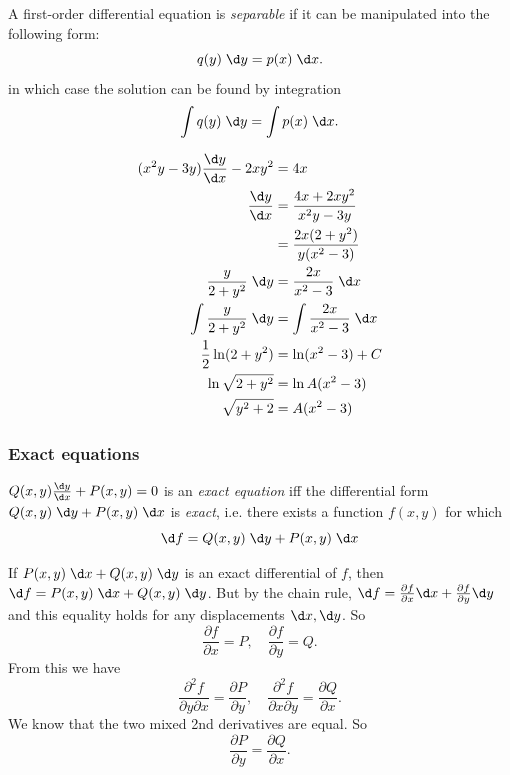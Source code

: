 \documentclass[a4paper]{article}
\begin{document}
\begin{defi}
  A first-order differential equation is \emph{separable} if it can be manipulated into the following form:
  \[
  q(y) \;\d y = p(x) \;\d x.
  \]
  in which case the solution can be found by integration
  \[
  \int q(y)\;\d y = \int p(x)\; \d x.
  \]
\end{defi}

\begin{eg}
  \begin{align*}
    (x^2y - 3y)\frac{\d y}{\d x} - 2xy^2 &= 4x\\
    \frac{\d y}{\d x} &= \frac{4x + 2xy^2}{x^2y - 3y}\\
    &= \frac{2x(2 +  y^2)}{y(x^2 - 3)}\\
    \frac{y}{2 + y^2}\; \d y &= \frac{2x}{x^2 - 3}\;\d x\\
    \int \frac{y}{2 + y^2}\; \d y &= \int\frac{2x}{x^2 - 3}\;\d x\\
    \frac{1}{2}\ln(2 + y^2) &= \ln (x^2 - 3) + C\\
    \ln \sqrt{2 + y^2} &= \ln A(x^2 - 3)\\
    \sqrt{y^2 + 2} &= A(x^2 - 3)
  \end{align*}
\end{eg}
\subsubsection{Exact equations}
\begin{defi}
  $Q(x, y)\frac{\d y}{\d x} + P(x, y) = 0$ is an \emph{exact equation} iff the differential form $Q(x, y)\;\d y + P(x, y)\;\d x$ is \emph{exact}, i.e. there exists a function $f(x, y)$ for which 
  \[
  \d f = Q(x, y)\;\d y + P(x, y)\;\d x
  \]
\end{defi}

If $P(x, y)\;\d x + Q(x, y)\;\d y$ is an exact differential of $f$, then $\d f = P(x, y) \;\d x + Q(x, y)\;\d y$. But by the chain rule, $\d f  = \frac{\partial f}{\partial x}\d x + \frac{\partial f}{\partial y}\d y$ and this equality holds for any displacements $\d x, \d y$. So
\[
\frac{\partial f}{\partial x} = P,\quad\frac{\partial f}{\partial y} = Q.
\]
From this we have
\[
\frac{\partial^2 f}{\partial y\partial x} = \frac{\partial P}{\partial y},\quad\frac{\partial^2 f}{\partial x \partial y} = \frac{\partial Q}{\partial x}.
\]
We know that the two mixed 2nd derivatives are equal. So
\[
\frac{\partial P}{\partial y} = \frac{\partial Q}{\partial x}.
\]
\end{document}
